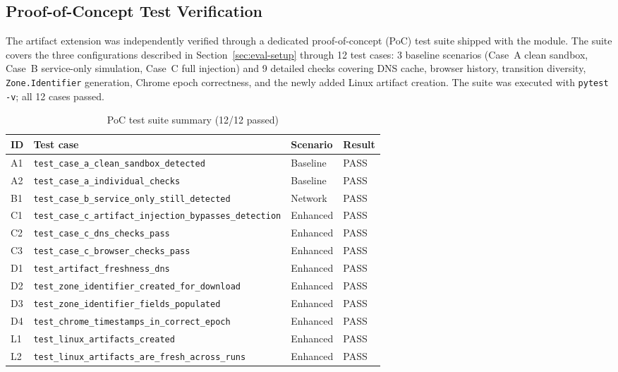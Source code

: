 \subsection{Proof-of-Concept Test Verification}
\label{sec:poc-verification}
The artifact extension was independently verified through a dedicated
proof-of-concept (PoC) test suite shipped with the module. The suite
covers the three configurations described in Section~\ref{sec:eval-setup}
through 12 test cases: 3 baseline scenarios (Case~A clean sandbox, Case~B
service-only simulation, Case~C full injection) and 9 detailed checks
covering DNS cache, browser history, transition diversity,
\texttt{Zone.Identifier} generation, Chrome epoch correctness, and the
newly added Linux artifact creation. The suite was executed with
\texttt{pytest -v}; all 12 cases passed.

\begin{table}[htbp]
\centering
\caption{PoC test suite summary (12/12 passed)}
\label{tab:poc-tests}
\begin{tabular}{|L{0.04\textwidth}|L{0.56\textwidth}|L{0.18\textwidth}|L{0.14\textwidth}|}
\hline
\textbf{ID} & \textbf{Test case} & \textbf{Scenario} & \textbf{Result} \\
\hline
A1 & \texttt{test\_case\_a\_clean\_sandbox\_detected}                & Baseline   & PASS \\
\hline
A2 & \texttt{test\_case\_a\_individual\_checks}                       & Baseline   & PASS \\
\hline
B1 & \texttt{test\_case\_b\_service\_only\_still\_detected}            & Network    & PASS \\
\hline
C1 & \texttt{test\_case\_c\_artifact\_injection\_bypasses\_detection}   & Enhanced   & PASS \\
\hline
C2 & \texttt{test\_case\_c\_dns\_checks\_pass}                         & Enhanced   & PASS \\
\hline
C3 & \texttt{test\_case\_c\_browser\_checks\_pass}                      & Enhanced   & PASS \\
\hline
D1 & \texttt{test\_artifact\_freshness\_dns}                            & Enhanced   & PASS \\
\hline
D2 & \texttt{test\_zone\_identifier\_created\_for\_download}            & Enhanced   & PASS \\
\hline
D3 & \texttt{test\_zone\_identifier\_fields\_populated}                 & Enhanced   & PASS \\
\hline
D4 & \texttt{test\_chrome\_timestamps\_in\_correct\_epoch}              & Enhanced   & PASS \\
\hline
L1 & \texttt{test\_linux\_artifacts\_created}                          & Enhanced   & PASS \\
\hline
L2 & \texttt{test\_linux\_artifacts\_are\_fresh\_across\_runs}          & Enhanced   & PASS \\
\hline
\end{tabular}
\end{table}

